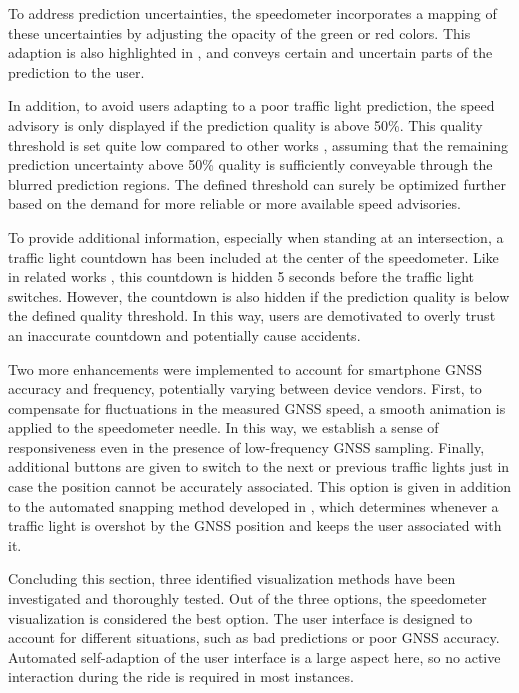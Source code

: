 To address prediction uncertainties, the speedometer incorporates a mapping of these uncertainties by adjusting the opacity of the green or red colors. This adaption is also highlighted in , and conveys certain and uncertain parts of the prediction to the user. 

In addition, to avoid users adapting to a poor traffic light prediction, the speed advisory is only displayed if the prediction quality is above 50\%. This quality threshold is set quite low compared to other works \cite{protschky_extensive_2014, protschky_adaptive_2014}, assuming that the remaining prediction uncertainty above 50\% quality is sufficiently conveyable through the blurred prediction regions. The defined threshold can surely be optimized further based on the demand for more reliable or more available speed advisories. 

To provide additional information, especially when standing at an intersection, a traffic light countdown has been included at the center of the speedometer. Like in related works \cite{stahlmann_exploring_2018, sokolov_effects_2018}, this countdown is hidden 5 seconds before the traffic light switches. However, the countdown is also hidden if the prediction quality is below the defined quality threshold. In this way, users are demotivated to overly trust an inaccurate countdown and potentially cause accidents.

Two more enhancements were implemented to account for smartphone GNSS accuracy and frequency, potentially varying between device vendors. First, to compensate for fluctuations in the measured GNSS speed, a smooth animation is applied to the speedometer needle. In this way, we establish a sense of responsiveness even in the presence of low-frequency GNSS sampling. Finally, additional buttons are given to switch to the next or previous traffic lights just in case the position cannot be accurately associated. This option is given in addition to the automated snapping method developed in , which determines whenever a traffic light is overshot by the GNSS position and keeps the user associated with it.

Concluding this section, three identified visualization methods have been investigated and thoroughly tested. Out of the three options, the speedometer visualization is considered the best option. The user interface is designed to account for different situations, such as bad predictions or poor GNSS accuracy. Automated self-adaption of the user interface is a large aspect here, so no active interaction during the ride is required in most instances.

